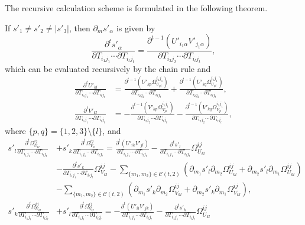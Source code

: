 The recursive calculation scheme is formulated in the following theorem.
\begin{theorem} \label{thm:MF-moment-dsdT}
	If $s'_1 \neq s'_2 \neq |s'_3|$, then $\partial_m s'_\alpha$ is given by
	\begin{equation} \label{eqn:MF-moment-dsdT}
		\frac{\partial^t s'_{\alpha}}{\partial T_{i_1j_1} \cdots \partial T_{i_tj_t}} = \frac{\partial^{t-1} (U'_{i_1\alpha}V'_{j_1\alpha})}{\partial T_{i_2j_2} \cdots \partial T_{i_tj_t}},
	\end{equation}
	which can be evaluated recursively by the chain rule and 
	\begin{align} \label{eqn:MF-moment-dUVdT}
		\frac{\partial^t U'_{kl}}{\partial T_{i_1j_1} \cdots \partial T_{i_tj_t}} &= \frac{\partial^{t-1} \left( U'_{kp}\Omega_{U_{pl}}^{i_1j_1} \right)}{\partial T_{i_2j_2} \cdots \partial T_{i_tj_t}} + \frac{\partial^{t-1} \left( U'_{kq}\Omega_{U_{ql}}^{i_1j_1} \right)}{\partial T_{i_2j_2} \cdots \partial T_{i_tj_t}}, \nonumber \\
		\frac{\partial^t V'_{kl}}{\partial T_{i_1j_1} \cdots \partial T_{i_tj_t}} &= -\frac{\partial^{t-1} \left( V'_{kp}\Omega_{V_{pl}}^{i_1j_1} \right)}{\partial T_{i_2j_2} \cdots \partial T_{i_tj_t}} - \frac{\partial^{t-1} \left( V'_{kq}\Omega_{V_{ql}}^{i_1j_1} \right)}{\partial T_{i_2j_2} \cdots \partial T_{i_tj_t}},
	\end{align}
	where $\{p,q\} = \{1,2,3\} \text{\textbackslash} \{l\}$, and
	\begin{subequations} \label{eqn:MF-moment-dOmegadT}
		\begin{align}
			s'_l \frac{\partial^t \Omega_{U_{kl}}^{ij}}{\partial T_{i_1j_1} \cdots \partial T_{i_tj_t}} &+ s'_k \frac{\partial^t \Omega_{V_{kl}}^{ij}}{\partial T_{i_1j_1} \cdots \partial T_{i_tj_t}} = \frac{\partial^t (U'_{ik}V'_{jl})}{\partial T_{i_1j_1} \cdots \partial T_{i_tj_t}} - \frac{\partial^t s'_l}{\partial T_{i_1j_1} \cdots \partial T_{i_tj_t}}\Omega_{U_{kl}}^{ij} \nonumber \\
			&- \frac{\partial^t s'_k}{\partial T_{i_1j_1} \cdots \partial T_{i_tj_t}}\Omega_{V_{kl}}^{ij} - \sum_{\{m_1,m_2\}\in\mathcal{C}(t,2)} \left( \partial_{m_1}s'_l\partial_{m_2}\Omega_{U_{kl}}^{ij} + \partial_{m_2}s'_l\partial_{m_1}\Omega_{U_{kl}}^{ij} \right) \nonumber \\
			&-\sum_{\{m_1,m_2\}\in\mathcal{C}(t,2)} \left( \partial_{m_1}s'_k\partial_{m_2}\Omega_{V_{kl}}^{ij} + \partial_{m_2}s'_k\partial_{m_1}\Omega_{V_{kl}}^{ij} \right), \\
			s'_k \frac{\partial^t \Omega_{U_{kl}}^{ij}}{\partial T_{i_1j_1} \cdots \partial T_{i_tj_t}} &+ s'_l \frac{\partial^t \Omega_{V_{kl}}^{ij}}{\partial T_{i_1j_1} \cdots \partial T_{i_tj_t}} = -\frac{\partial^t (U'_{il}V'_{jk})}{\partial T_{i_1j_1} \cdots \partial T_{i_tj_t}} - \frac{\partial^t s'_k}{\partial T_{i_1j_1} \cdots \partial T_{i_tj_t}}\Omega_{U_{kl}}^{ij} \nonumber \\

\end{align}
\end{subequations}
\end{theorem}
